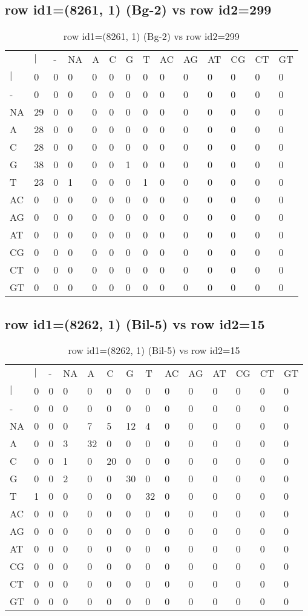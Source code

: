 \subsection{row id1=(8261, 1) (Bg-2) vs row id2=299}
\begin{center}
\begin{longtable}{|l|l|l|l|l|l|l|l|l|l|l|l|l|l|}
\caption{row id1=(8261, 1) (Bg-2) vs row id2=299} \label{table_dm214}\\
\hline
\\
\hline
&$|$&-&NA&A&C&G&T&AC&AG&AT&CG&CT&GT\\
$|$&0&0&0&0&0&0&0&0&0&0&0&0&0\\
-&0&0&0&0&0&0&0&0&0&0&0&0&0\\
NA&29&0&0&0&0&0&0&0&0&0&0&0&0\\
A&28&0&0&0&0&0&0&0&0&0&0&0&0\\
C&28&0&0&0&0&0&0&0&0&0&0&0&0\\
G&38&0&0&0&0&1&0&0&0&0&0&0&0\\
T&23&0&1&0&0&0&1&0&0&0&0&0&0\\
AC&0&0&0&0&0&0&0&0&0&0&0&0&0\\
AG&0&0&0&0&0&0&0&0&0&0&0&0&0\\
AT&0&0&0&0&0&0&0&0&0&0&0&0&0\\
CG&0&0&0&0&0&0&0&0&0&0&0&0&0\\
CT&0&0&0&0&0&0&0&0&0&0&0&0&0\\
GT&0&0&0&0&0&0&0&0&0&0&0&0&0\\
\hline
\end{longtable}
\end{center}

\subsection{row id1=(8262, 1) (Bil-5) vs row id2=15}
\begin{center}
\begin{longtable}{|l|l|l|l|l|l|l|l|l|l|l|l|l|l|}
\caption{row id1=(8262, 1) (Bil-5) vs row id2=15} \label{table_dm216}\\
\hline
\\
\hline
&$|$&-&NA&A&C&G&T&AC&AG&AT&CG&CT&GT\\
$|$&0&0&0&0&0&0&0&0&0&0&0&0&0\\
-&0&0&0&0&0&0&0&0&0&0&0&0&0\\
NA&0&0&0&7&5&12&4&0&0&0&0&0&0\\
A&0&0&3&32&0&0&0&0&0&0&0&0&0\\
C&0&0&1&0&20&0&0&0&0&0&0&0&0\\
G&0&0&2&0&0&30&0&0&0&0&0&0&0\\
T&1&0&0&0&0&0&32&0&0&0&0&0&0\\
AC&0&0&0&0&0&0&0&0&0&0&0&0&0\\
AG&0&0&0&0&0&0&0&0&0&0&0&0&0\\
AT&0&0&0&0&0&0&0&0&0&0&0&0&0\\
CG&0&0&0&0&0&0&0&0&0&0&0&0&0\\
CT&0&0&0&0&0&0&0&0&0&0&0&0&0\\
GT&0&0&0&0&0&0&0&0&0&0&0&0&0\\
\hline
\end{longtable}
\end{center}

